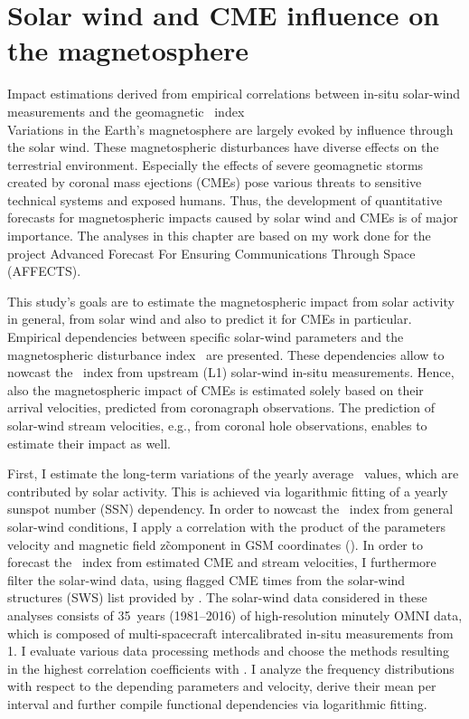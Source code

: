 
\chapter{Solar wind and CME influence on the magnetosphere}
\label{chap:chapter2}

Impact estimations derived from empirical correlations between in-situ solar-wind measurements and the geomagnetic \Kp{}~index\\


Variations in the Earth's magnetosphere are largely evoked by influence through the solar wind. These magnetospheric disturbances have diverse effects on the terrestrial environment. Especially the effects of severe geomagnetic storms created by coronal mass ejections (CMEs) pose various threats to sensitive technical systems and exposed humans. Thus, the development of quantitative forecasts for magnetospheric impacts caused by solar wind and CMEs is of major importance. The analyses in this chapter are based on my work done for the project Advanced Forecast For Ensuring Communications Through Space (AFFECTS).

This study's goals are to estimate the magnetospheric impact from solar activity in general, from solar wind and also to predict it for CMEs in particular. Empirical dependencies between specific solar-wind parameters and the magnetospheric disturbance index~\Kp{} are presented. These dependencies allow to nowcast the \Kp~index from upstream (L1) solar-wind in-situ measurements. Hence, also the magnetospheric impact of CMEs is estimated solely based on their arrival velocities, predicted from coronagraph observations. The prediction of solar-wind stream velocities, e.g., from coronal hole observations, enables to estimate their impact as well.

First, I estimate the long-term variations of the yearly average \Kp{}~values, which are contributed by solar activity. This is achieved via logarithmic fitting of a yearly sunspot number (SSN) dependency. In order to nowcast the \Kp~index from general solar-wind conditions, I apply a correlation with the product of the parameters velocity and magnetic field z\~component in GSM coordinates (\vBz{}). In order to forecast the \Kp~index from estimated CME and stream velocities, I furthermore filter the solar-wind data, using flagged CME times from the solar-wind structures (SWS) list provided by \citet{Richardson2012}. The solar-wind data considered in these analyses consists of 35~years (1981--2016) of high-resolution minutely OMNI data, which is composed of multi-spacecraft intercalibrated in-situ measurements from \SI{1}{\au}. I evaluate various data processing methods and choose the methods resulting in the highest correlation coefficients with \Kp{}. I analyze the \Kp{} frequency distributions with respect to the depending parameters \vBz{} and velocity, derive their mean \Kp{} per interval and further compile functional dependencies via logarithmic fitting.

